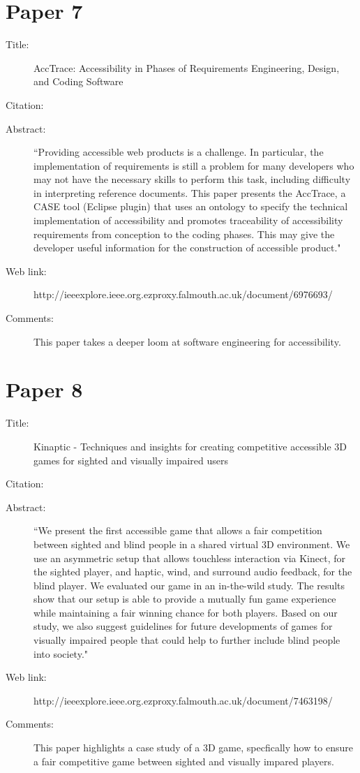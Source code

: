 \documentclass{scrartcl}
\begin{document}
\section*{Paper 7}
\begin{description}
\item[Title:] AccTrace: Accessibility in Phases of Requirements Engineering, Design, and Coding Software
\item[Citation:] \cite{Branco}
\item[Abstract:] ``Providing accessible web products is a challenge. In particular, the implementation of requirements is still a problem for many developers who may not have the necessary skills to perform this task, including difficulty in interpreting reference documents. This paper presents the AccTrace, a CASE tool (Eclipse plugin) that uses an ontology to specify the technical implementation of accessibility and promotes traceability of accessibility requirements from conception to the coding phases. This may give the developer useful information for the construction of accessible product."
\item[Web link:] http://ieeexplore.ieee.org.ezproxy.falmouth.ac.uk/document/6976693/
\item[Comments:]  This paper takes a deeper loom at software engineering for accessibility.
\end{description}

\section*{Paper 8}
\begin{description}
\item[Title:] Kinaptic - Techniques and insights for creating competitive accessible 3D games for sighted and visually impaired users
\item[Citation:] \cite{Grabski}
\item[Abstract:] ``We present the first accessible game that allows a fair competition between sighted and blind people in a shared virtual 3D environment. We use an asymmetric setup that allows touchless interaction via Kinect, for the sighted player, and haptic, wind, and surround audio feedback, for the blind player. We evaluated our game in an in-the-wild study. The results show that our setup is able to provide a mutually fun game experience while maintaining a fair winning chance for both players. Based on our study, we also suggest guidelines for future developments of games for visually impaired people that could help to further include blind people into society."
\item[Web link:] http://ieeexplore.ieee.org.ezproxy.falmouth.ac.uk/document/7463198/
\item[Comments:] This paper highlights a case study of a 3D game, specfically how to ensure a fair competitive game between sighted and visually impared players. 
\end{description}
\end{document}

